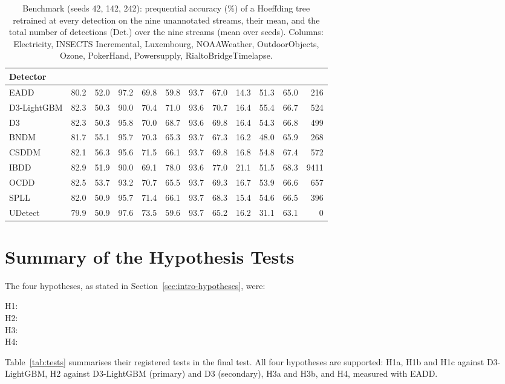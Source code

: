 \begin{table}[!htbp]
\centering
\caption[Benchmark: classifier accuracy on the unannotated streams]{Benchmark (seeds 42, 142, 242): prequential accuracy (\%) of a Hoeffding tree retrained at every detection on the nine unannotated streams, their mean, and the total number of detections (Det.) over the nine streams (mean over seeds). Columns: Electricity, INSECTS Incremental, Luxembourg, NOAAWeather, OutdoorObjects, Ozone, PokerHand, Powersupply, RialtoBridgeTimelapse.}
\label{tab:e4-acc}
\footnotesize
\setlength{\tabcolsep}{2.5pt}
\begin{tabular}{l*{10}{d{2.1}}d{4.0}}
\toprule
Detector &  &  &  &  &  &  &  &  &  &  &  \\
\midrule
EADD & 80.2 & 52.0 & 97.2 & 69.8 & 59.8 & 93.7 & 67.0 & 14.3 & 51.3 & 65.0 & 216 \\
D3-LightGBM & 82.3 & 50.3 & 90.0 & 70.4 & 71.0 & 93.6 & 70.7 & 16.4 & 55.4 & 66.7 & 524 \\
D3 & 82.3 & 50.3 & 95.8 & 70.0 & 68.7 & 93.6 & 69.8 & 16.4 & 54.3 & 66.8 & 499 \\
BNDM & 81.7 & 55.1 & 95.7 & 70.3 & 65.3 & 93.7 & 67.3 & 16.2 & 48.0 & 65.9 & 268 \\
CSDDM & 82.1 & 56.3 & 95.6 & 71.5 & 66.1 & 93.7 & 69.8 & 16.8 & 54.8 & 67.4 & 572 \\
IBDD & 82.9 & 51.9 & 90.0 & 69.1 & 78.0 & 93.6 & 77.0 & 21.1 & 51.5 & 68.3 & 9411 \\
OCDD & 82.5 & 53.7 & 93.2 & 70.7 & 65.5 & 93.7 & 69.3 & 16.7 & 53.9 & 66.6 & 657 \\
SPLL & 82.0 & 50.9 & 95.7 & 71.4 & 66.1 & 93.7 & 68.3 & 15.4 & 54.6 & 66.5 & 396 \\
UDetect & 79.9 & 50.9 & 97.6 & 73.5 & 59.6 & 93.7 & 65.2 & 16.2 & 31.1 & 63.1 & 0 \\
\bottomrule
\end{tabular}
\end{table}

\section{Summary of the Hypothesis Tests}

The four hypotheses, as stated in Section~\ref{sec:intro-hypotheses}, were:
\begin{description}
    \item[H1:] \hypHone
    \item[H2:] \hypHtwo
    \item[H3:] \hypHthree
    \item[H4:] \hypHfour
\end{description}
Table~\ref{tab:tests} summarises their registered tests in the final test. All four hypotheses are supported: H1a, H1b and H1c against D3-LightGBM, H2 against D3-LightGBM (primary) and D3 (secondary), H3a and H3b, and H4, measured with EADD.


